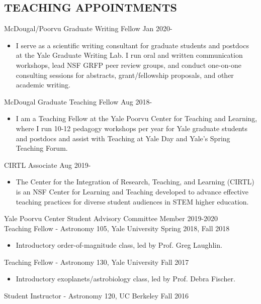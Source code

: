 \documentclass[margin]{res}
\begin{document}
\begin{resume}
\section{\normalfont TEACHING APPOINTMENTS}
McDougal/Poorvu Graduate Writing Fellow \hfill Jan 2020-
\begin{itemize}
    \item I serve as a scientific writing consultant for graduate students and postdocs at the Yale Graduate Writing Lab. I run oral and written communication workshops, lead NSF GRFP peer review groups, and conduct one-on-one consulting sessions for abstracts, grant/fellowship proposals, and other academic writing.
\end{itemize}
\vspace{-3mm}
McDougal Graduate Teaching Fellow \hfill Aug 2018-
\begin{itemize}
    \item I am a Teaching Fellow at the Yale Poorvu Center for Teaching and Learning, where I run 10-12 pedagogy workshops per year for Yale graduate students and postdocs and assist with Teaching at Yale Day and Yale's Spring Teaching Forum.
\end{itemize}
\vspace{-3mm}
CIRTL Associate \hfill Aug 2019-
\begin{itemize}
    \item The Center for the Integration of Research, Teaching, and Learning (CIRTL) is an NSF Center for Learning and Teaching developed to advance effective teaching practices for diverse student audiences in STEM higher education.
\end{itemize}
\vspace{-3mm}
Yale Poorvu Center Student Advisory Committee Member \hfill 2019-2020 \\
Teaching Fellow - Astronomy 105, Yale University \hfill Spring 2018, Fall 2018
\begin{itemize}
    \item Introductory order-of-magnitude class, led by Prof. Greg Laughlin.
\end{itemize}
\vspace{-3mm}
Teaching Fellow - Astronomy 130, Yale University \hfill Fall 2017
\begin{itemize}
    \item Introductory exoplanets/astrobiology class, led by Prof. Debra Fischer.
\end{itemize}
\vspace{-3mm}
Student Instructor - Astronomy 120, UC Berkeley \hfill Fall 2016

\end{resume}
\end{document}

